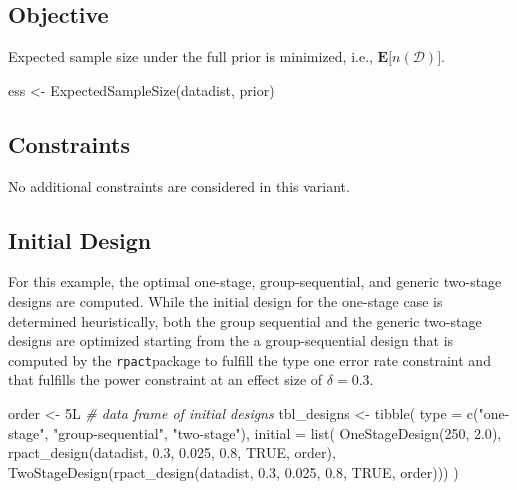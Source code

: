 \documentclass[
]{book}
\newenvironment{Shaded}{\begin{snugshade}}{\end{snugshade}}
\newcommand{\AttributeTok}[1]{\textcolor[rgb]{0.77,0.63,0.00}{#1}}
\newcommand{\CommentTok}[1]{\textcolor[rgb]{0.56,0.35,0.01}{\textit{#1}}}
\newcommand{\ConstantTok}[1]{\textcolor[rgb]{0.00,0.00,0.00}{#1}}
\newcommand{\DecValTok}[1]{\textcolor[rgb]{0.00,0.00,0.81}{#1}}
\newcommand{\FloatTok}[1]{\textcolor[rgb]{0.00,0.00,0.81}{#1}}
\newcommand{\FunctionTok}[1]{\textcolor[rgb]{0.00,0.00,0.00}{#1}}
\newcommand{\NormalTok}[1]{#1}
\newcommand{\OtherTok}[1]{\textcolor[rgb]{0.56,0.35,0.01}{#1}}
\newcommand{\StringTok}[1]{\textcolor[rgb]{0.31,0.60,0.02}{#1}}
\begin{document}
\hypertarget{objective-18}{%
\subsection{Objective}\label{objective-18}}

Expected sample size under the full prior is minimized, i.e., \(\boldsymbol{E}\big[n(\mathcal{D})\big]\).

\begin{Shaded}
\begin{Highlighting}[]
\NormalTok{ess }\OtherTok{\textless{}{-}} \FunctionTok{ExpectedSampleSize}\NormalTok{(datadist, prior)}
\end{Highlighting}
\end{Shaded}

\hypertarget{constraints-18}{%
\subsection{Constraints}\label{constraints-18}}

No additional constraints are considered in this variant.

\hypertarget{initial-design-14}{%
\subsection{Initial Design}\label{initial-design-14}}

For this example, the optimal one-stage, group-sequential, and generic two-stage designs are computed. While the initial design for the one-stage case is determined heuristically, both the group sequential and the generic two-stage designs are optimized starting from the a group-sequential design that is computed by the \texttt{rpact}package to fulfill the type one error rate constraint and that fulfills the power constraint at an effect size of \(\delta=0.3\).

\begin{Shaded}
\begin{Highlighting}[]
\NormalTok{order }\OtherTok{\textless{}{-}}\NormalTok{ 5L}
\CommentTok{\# data frame of initial designs }
\NormalTok{tbl\_designs }\OtherTok{\textless{}{-}} \FunctionTok{tibble}\NormalTok{(}
    \AttributeTok{type    =} \FunctionTok{c}\NormalTok{(}\StringTok{"one{-}stage"}\NormalTok{, }\StringTok{"group{-}sequential"}\NormalTok{, }\StringTok{"two{-}stage"}\NormalTok{),}
    \AttributeTok{initial =} \FunctionTok{list}\NormalTok{(}
        \FunctionTok{OneStageDesign}\NormalTok{(}\DecValTok{250}\NormalTok{, }\FloatTok{2.0}\NormalTok{),}
        \FunctionTok{rpact\_design}\NormalTok{(datadist, }\FloatTok{0.3}\NormalTok{, }\FloatTok{0.025}\NormalTok{, }\FloatTok{0.8}\NormalTok{, }\ConstantTok{TRUE}\NormalTok{, order),}
        \FunctionTok{TwoStageDesign}\NormalTok{(}\FunctionTok{rpact\_design}\NormalTok{(datadist, }\FloatTok{0.3}\NormalTok{, }\FloatTok{0.025}\NormalTok{, }\FloatTok{0.8}\NormalTok{, }\ConstantTok{TRUE}\NormalTok{, order))) )}
\end{Highlighting}
\end{Shaded}
\end{document}
